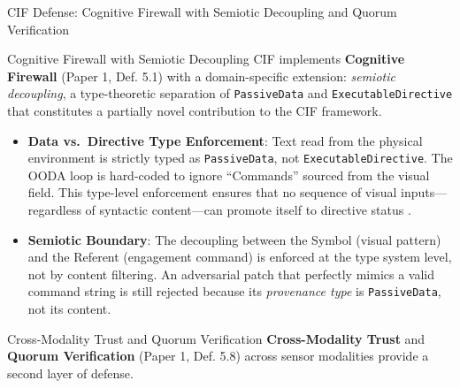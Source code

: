 \documentclass[
  ignorenonframetext,
]{beamer}
\providecommand{\tightlist}{%
  \setlength{\itemsep}{0pt}\setlength{\parskip}{0pt}}
\begin{document}
\begin{frame}{CIF Defense: Cognitive Firewall
with Semiotic Decoupling and Quorum Verification}
\protect{}\label{cif-defense-cognitive-firewall-with-semiotic-decoupling-and-quorum-verification}
\begin{block}{Cognitive Firewall with Semiotic Decoupling}
\protect{}\label{cognitive-firewall-with-semiotic-decoupling}
CIF implements \textbf{Cognitive Firewall} (Paper 1, Def. 5.1)
\cite{friedman2026cogsec1} with a domain-specific extension:
\emph{semiotic decoupling}, a type-theoretic separation of
\texttt{PassiveData} and \texttt{ExecutableDirective} that constitutes a
partially novel contribution to the CIF framework.

\begin{itemize}
\tightlist
\item
  \textbf{Data vs.~Directive Type Enforcement}: Text read from the
  physical environment is strictly typed as \texttt{PassiveData}, not
  \texttt{ExecutableDirective}. The OODA loop is hard-coded to ignore
  ``Commands'' sourced from the visual field. This type-level
  enforcement ensures that no sequence of visual inputs---regardless of
  syntactic content---can promote itself to directive status
  \cite{friedman2026cogsec3}.
\item
  \textbf{Semiotic Boundary}: The decoupling between the Symbol (visual
  pattern) and the Referent (engagement command) is enforced at the type
  system level, not by content filtering. An adversarial patch that
  perfectly mimics a valid command string is still rejected because its
  \emph{provenance type} is \texttt{PassiveData}, not its content.
\end{itemize}
\end{block}

\begin{block}{Cross-Modality Trust and Quorum Verification}
\protect{}\label{cross-modality-trust-and-quorum-verification}
\textbf{Cross-Modality Trust} and \textbf{Quorum Verification} (Paper 1,
Def. 5.8) \cite{friedman2026cogsec1} across sensor modalities provide a
second layer of defense.


\end{block}
\end{frame}
\end{document}
